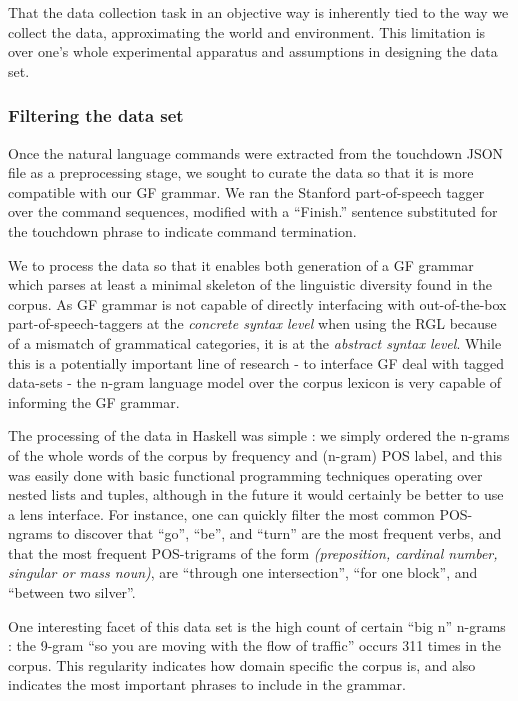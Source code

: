 \documentclass{article}
\begin{document}
That the data collection task in an objective way is inherently tied to the way
we collect the data, approximating the world and environment. This limitation is
over one's whole experimental apparatus and assumptions in designing the data set.

\subsubsection{Filtering the data set}

Once the natural language commands were extracted from the touchdown JSON file as a preprocessing stage,
we sought to curate the data so that it is more compatible with our GF grammar. We ran the Stanford part-of-speech tagger
\cite{toutanova-etal-2003-feature} over the command sequences, modified with a
``Finish.'' sentence substituted for the touchdown phrase to indicate command
termination.

We to process the data so that it enables both generation of a GF grammar which
parses at least a minimal skeleton of the linguistic diversity found in the
corpus. As GF grammar is not capable of directly interfacing with out-of-the-box
part-of-speech-taggers at the \emph{concrete syntax level} when using the RGL
because of a mismatch of grammatical categories, it is at the \emph{abstract
syntax level}. While this is a potentially important line of research - to
interface GF deal with tagged data-sets - the n-gram language model over
the corpus  lexicon is very capable of informing the GF grammar.

The processing of the data in Haskell was simple : we simply ordered the n-grams
of the whole words of the corpus by frequency and (n-gram) POS label, and this
was easily done with basic functional programming techniques operating over
nested lists and tuples, although in the future it would certainly be better to use a lens
interface. For instance, one can quickly filter the most common
POS-ngrams to discover that ``go'', ``be'', and ``turn'' are the most frequent
verbs, and that the most frequent POS-trigrams of the form \emph{(preposition,
cardinal number, singular or mass noun)}, are ``through one intersection'', ``for
one block'', and ``between two silver''.

One interesting facet of this data set is the high count of certain ``big n''
n-grams : the 9-gram ``so you are moving with the flow of traffic'' occurs 311
times in the corpus. This regularity indicates how domain specific the corpus
is, and also indicates the most important phrases to include in the grammar.
\end{document}

